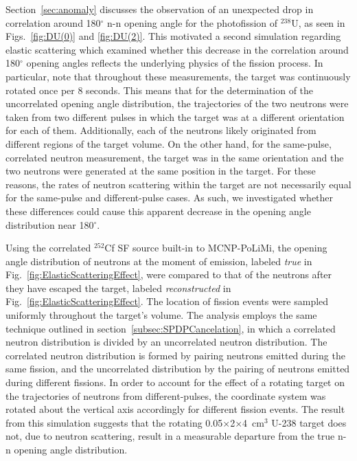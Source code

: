 Section~\ref{sec:anomaly} discusses the observation of an unexpected drop in correlation around 180$^{\circ}$ n-n opening angle for the photofission of $^{238}$U, as seen in Figs.~\ref{fig:DU(0)} and \ref{fig:DU(2)}.
This motivated a second simulation regarding elastic scattering which examined whether this decrease in the correlation around 180$^{\circ}$ opening angles reflects the underlying physics of the fission process.
In particular, note that throughout these measurements, the target was continuously rotated once per 8 seconds.
This means that for the determination of the uncorrelated opening angle distribution, the trajectories of the two neutrons were taken from two different pulses in which the target was at a different orientation for each of them.
Additionally, each of the neutrons likely originated from different regions of the target volume.
On the other hand, for the same-pulse, correlated neutron measurement, the target was in the same orientation and the two neutrons were generated at the same position in the target.
For these reasons, the rates of neutron scattering within the target are not necessarily equal for the same-pulse and different-pulse cases.
As such, we investigated whether these differences could cause this apparent decrease in the opening angle distribution near 180$^{\circ}$.

Using the correlated $^{252}$Cf SF source built-in to MCNP-PoLiMi, the opening angle distribution of neutrons at the moment of emission, labeled \emph{true} in Fig.~\ref{fig:ElasticScatteringEffect}, were compared to that of the neutrons after they have escaped the target, labeled \emph{reconstructed} in Fig.~\ref{fig:ElasticScatteringEffect}.
The location of fission events were sampled uniformly throughout the target's volume.
The analysis employs the same technique outlined in section~\ref{subsec:SPDPCancelation}, in which a correlated neutron distribution is divided by an uncorrelated neutron distribution.
The correlated neutron distribution is formed by pairing neutrons emitted during the same fission, and the uncorrelated distribution by the pairing of neutrons emitted during different fissions.
In order to account for the effect of a rotating target on the trajectories of neutrons from different-pulses, the coordinate system was rotated about the vertical axis accordingly for different fission events.
The result from this simulation suggests that the rotating 0.05$\times$2$\times$4~cm$^3$ U-238 target does not, due to neutron scattering, result in a measurable departure from the true n-n opening angle distribution.


